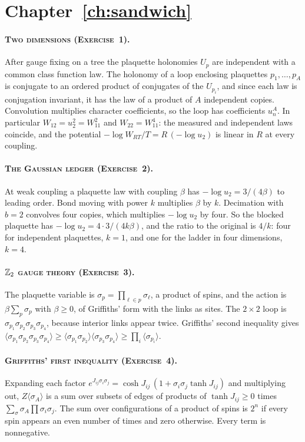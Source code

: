 \section*{Chapter~\ref{ch:sandwich}}

\paragraph{\normalfont\scshape Two dimensions (Exercise~1).} After gauge fixing on a tree the plaquette holonomies $U_p$ are independent with a common class function law. The holonomy of a loop enclosing plaquettes $p_1,\dots,p_A$ is conjugate to an ordered product of conjugates of the $U_{p_i}$, and since each law is conjugation invariant, it has the law of a product of $A$ independent copies. Convolution multiplies character coefficients, so the loop has coefficients $u_n^A$. In particular $W_{12}=u_2^2=W_{11}^2$ and $W_{22}=W_{11}^4$: the measured and independent laws coincide, and the potential $-\log W_{RT}/T=R\,(-\log u_2)$ is linear in $R$ at every coupling.

\paragraph{\normalfont\scshape The Gaussian ledger (Exercise~2).} At weak coupling a plaquette law with coupling $\beta$ has $-\log u_2=3/(4\beta)$ to leading order. Bond moving with power $k$ multiplies $\beta$ by $k$. Decimation with $b=2$ convolves four copies, which multiplies $-\log u_2$ by four. So the blocked plaquette has $-\log u_2=4\cdot3/(4k\beta)$, and the ratio to the original is $4/k$: four for independent plaquettes, $k=1$, and one for the ladder in four dimensions, $k=4$.

\paragraph{\normalfont\scshape $\mathbb{Z}_2$ gauge theory (Exercise~3).} The plaquette variable is $\sigma_p=\prod_{\ell\in p}\sigma_\ell$, a product of spins, and the action is $\beta\sum_p\sigma_p$ with $\beta\ge0$, of Griffiths' form with the links as sites. The $2\times2$ loop is $\sigma_{p_1}\sigma_{p_2}\sigma_{p_3}\sigma_{p_4}$, because interior links appear twice. Griffiths' second inequality gives $\langle\sigma_{p_1}\sigma_{p_2}\sigma_{p_3}\sigma_{p_4}\rangle\ge\langle\sigma_{p_1}\sigma_{p_2}\rangle\langle\sigma_{p_3}\sigma_{p_4}\rangle\ge\prod_i\langle\sigma_{p_i}\rangle$.

\paragraph{\normalfont\scshape Griffiths' first inequality (Exercise~4).} Expanding each factor $e^{J_{ij}\sigma_i\sigma_j}=\cosh J_{ij}\,(1+\sigma_i\sigma_j\tanh J_{ij})$ and multiplying out, $Z\langle\sigma_A\rangle$ is a sum over subsets of edges of products of $\tanh J_{ij}\ge0$ times $\sum_\sigma\sigma_A\prod\sigma_i\sigma_j$. The sum over configurations of a product of spins is $2^n$ if every spin appears an even number of times and zero otherwise. Every term is nonnegative.

